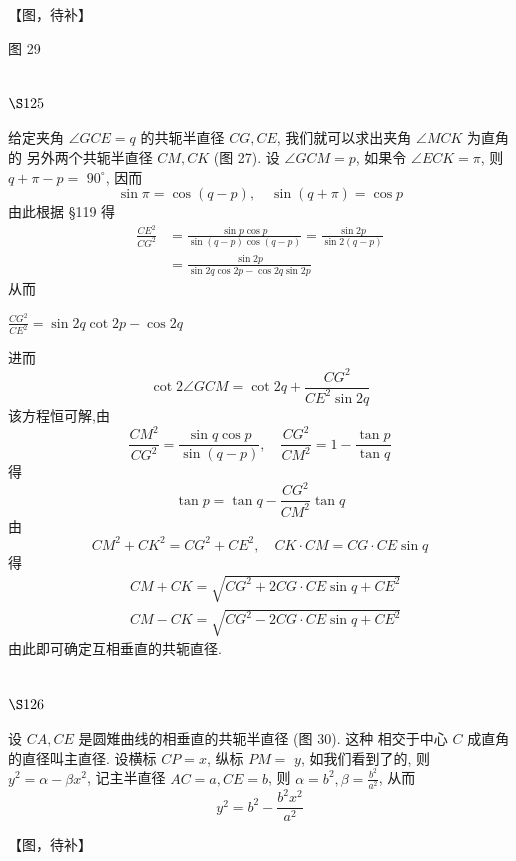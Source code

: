 【图，待补】

图 29

\section{$\S 125$}

给定夹角 $\angle G C E=q$ 的共轭半直径 $C G, C E$, 我们就可以求出夹角 $\angle M C K$ 为直角的 另外两个共轭半直径 $C M, C K$ (图 27). 设 $\angle G C M=p$, 如果令 $\angle E C K=\pi$, 则 $q+\pi-p=$ $90^{\circ}$, 因而
\[
\sin \pi=\cos (q-p), \quad \sin (q+\pi)=\cos p
\]
由此根据 §119 得
\[
\begin{aligned}
\frac{C E^{2}}{C G^{2}} & =\frac{\sin p \cos p}{\sin (q-p) \cos (q-p)}=\frac{\sin 2 p}{\sin 2(q-p)} \\
& =\frac{\sin 2 p}{\sin 2 q \cos 2 p-\cos 2 q \sin 2 p}
\end{aligned}
\]
从而 

$\frac{C G^{2}}{C E^{2}}=\sin 2 q \cot 2 p-\cos 2 q$

进而
\[
\cot 2 \angle G C M=\cot 2 q+\frac{C G^{2}}{C E^{2} \sin 2 q}
\]
该方程恒可解,由
\[
\frac{C M^{2}}{C G^{2}}=\frac{\sin q \cos p}{\sin (q-p)}, \quad \frac{C G^{2}}{C M^{2}}=1-\frac{\tan p}{\tan q}
\]
得
\[
\tan p=\tan q-\frac{C G^{2}}{C M^{2}} \tan q
\]
由
\[
C M^{2}+C K^{2}=C G^{2}+C E^{2}, \quad C K \cdot C M=C G \cdot C E \sin q
\]
得
\[
\begin{aligned}
& C M+C K=\sqrt{C G^{2}+2 C G \cdot C E \sin q+C E^{2}} \\
& C M-C K=\sqrt{C G^{2}-2 C G \cdot C E \sin q+C E^{2}}
\end{aligned}
\]
由此即可确定互相垂直的共轭直径.

\section{$\S 126$}

设 $C A, C E$ 是圆雉曲线的相垂直的共轭半直径 (图 30). 这种 相交于中心 $C$ 成直角的直径叫主直径. 设横标 $C P=x$, 纵标 $P M=$ $y$, 如我们看到了的, 则 $y^{2}=\alpha-\beta x^{2}$, 记主半直径 $A C=a, C E=b$, 则 $\alpha=b^{2}, \beta=\frac{b^{2}}{a^{2}}$, 从而
\[
y^{2}=b^{2}-\frac{b^{2} x^{2}}{a^{2}}
\]

【图，待补】

